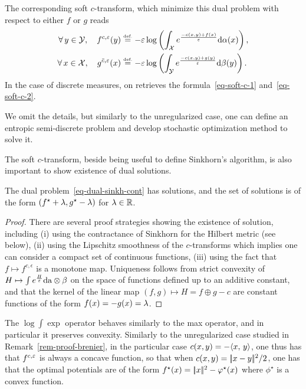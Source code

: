The corresponding soft $c$-transform, which minimize this dual problem with respect to either $f$ or $g$ reads 
\begin{align*}
	\forall \, y \in \mathcal{Y}, \quad
	f^{c,\varepsilon}(y) &\stackrel{\mbox{\upshape\tiny def.}}{=} - \varepsilon \log\left(  
			\int_{\mathcal{X}} e^{\frac{-c(x,y) + f(x)}{\varepsilon}} \mathrm{d}\alpha(x)
	 \right),\\
	\forall \, x \in \mathcal{X}, \quad
	g^{\bar{c},\varepsilon}(x) &\stackrel{\mbox{\upshape\tiny def.}}{=} - \varepsilon \log\left(  
			\int_{\mathcal{Y}} e^{\frac{-c(x,y) + g(y)}{\varepsilon}} \mathrm{d}\beta(y)
	 \right).
\end{align*}
In the case of discrete measures, on retrieves the formula~\eqref{eq-soft-c-1} and~\eqref{eq-soft-c-2}.

We omit the details, but similarly to the unregularized case, one can define an entropic semi-discrete problem and develop stochastic optimization method to solve it. 

The soft $c$-transform, beside being useful to define Sinkhorn's algorithm, is also important to show existence of dual solutions. 

\begin{prop}
	The dual problem~\eqref{eq-dual-sinkh-cont} has solutions, and the set of solutions is of the form 
	$(f^\star+\lambda,g^\star-\lambda)$ for $\lambda \in \mathbb{R}$. 
\end{prop}
\begin{proof}
	There are several proof strategies showing the existence of solution, including (i) using the contractance of Sinkhorn for the Hilbert metric (see below), (ii) using the Lipschitz smoothness of the $c$-transforms which implies one can consider a compact set of continuous functions, (iii) using the fact that $f \mapsto f^{c,\epsilon}$ is a monotone map. 
	Uniqueness follows from strict convexity of $H \mapsto \int e^{\frac{H}{\varepsilon}} \mathrm{d} \mathrm{a}\otimes\beta$ on the space of functions defined up to an additive constant, and that the kernel of the linear map $(f,g) \mapsto H = f \oplus g-c$ are constant functions of the form $f(x)=-g(x)=\lambda$. 
\end{proof}


%

\begin{rem}
	The $\log \int \exp$ operator behaves similarly to the max operator, and in particular it preserves convexity.
	Similarly to the unregularized case studied in Remark~\ref{rem-proof-brenier}, in the particular case $c(x,y)=-\langle x,\,y\rangle$, one thus has that $f^{c,\varepsilon}$ is always a concave function, so that when $c(x,y)=|\!| x-y |\!|^2/2$, one has that the optimal potentials are of the form $f^\star(x)=|\!| x |\!|^2-\varphi^\star(x)$ where $\phi^\star$ is a convex function.
\end{rem}


